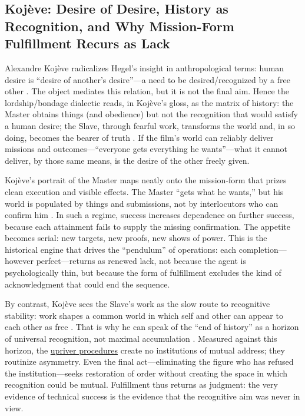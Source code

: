 \subsection*{Koj{\`e}ve: Desire of Desire, History as Recognition, and Why Mission-Form
	Fulfillment Recurs as Lack}
\label{ssec:iii-kojeve}
Alexandre Koj{\`e}ve radicalizes Hegel's insight in anthropological terms: human desire is
``desire of another's desire''—a need to be desired/recognized by a free other
\parencite[p.~6]{KojeveIRH1980}.
The object mediates this relation, but it is not the final aim. Hence the lordship/bondage
dialectic reads, in Koj{\`e}ve's gloss, as the matrix of history: the Master obtains things
(and obedience) but not the recognition that would satisfy a human desire; the Slave, through
fearful work, transforms the world and, in so doing, becomes the bearer of truth
\parencite[pp.~27--34, 158--164]{KojeveIRH1980}. If the film's world can reliably deliver
missions and outcomes—``everyone gets everything he wants''—what it cannot deliver, by those
same means, is the desire of the other freely given.

Koj{\`e}ve's portrait of the Master maps neatly onto the mission-form that prizes clean
execution and visible effects. The Master ``gets what he wants,'' but his world is populated by
things and submissions, not by interlocutors who can confirm him
\parencite[pp.~27--34]{KojeveIRH1980}. In such a regime, success increases dependence on further
success, because each attainment fails to supply the missing confirmation. The appetite becomes
serial: new targets, new proofs, new shows of power. This is the historical engine that drives
the ``pendulum'' of operations: each completion—however perfect—returns as renewed lack, not
because the agent is psychologically thin, but because the form of fulfillment excludes the kind
of acknowledgment that could end the sequence.

By contrast, Koj{\`e}ve sees the Slave's work as the slow route to recognitive stability: work
shapes a common world in which self and other can appear to each other as free
\parencite[pp.~158--164]{KojeveIRH1980}. That is why he can speak of the ``end of history'' as
a horizon of universal recognition, not maximal accumulation
\parencite[pp.~158--164]{KojeveIRH1980}. Measured against this horizon, the
\hyperref[scene:upriver-journey]{upriver procedures} create no institutions of mutual address;
they routinize asymmetry. Even the final act—eliminating
the figure who has refused the institution—seeks restoration of order without creating the space
in which recognition could be mutual. Fulfillment thus returns as judgment: the very evidence of
technical success is the evidence that the recognitive aim was never in view.

